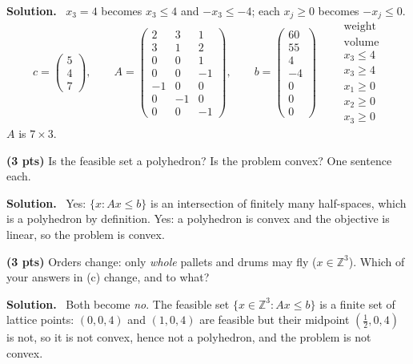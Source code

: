 \documentclass[10pt]{article}
\newenvironment{solution}
  {\par\smallskip\begingroup\color{solink}\textbf{Solution.}\ }
  {\endgroup\par}
\begin{document}
\begin{parts}
\begin{solution}
$x_3 = 4$ becomes $x_3 \le 4$ and $-x_3 \le -4$; each $x_j \ge 0$ becomes $-x_j \le 0$.
\[
c = \begin{pmatrix} 5 \\ 4 \\ 7 \end{pmatrix}, \qquad
A = \begin{pmatrix}
  2 & 3 & 1 \\
  3 & 1 & 2 \\
  0 & 0 & 1 \\
  0 & 0 & -1 \\
  -1 & 0 & 0 \\
  0 & -1 & 0 \\
  0 & 0 & -1
\end{pmatrix}, \qquad
b = \begin{pmatrix} 60 \\ 55 \\ 4 \\ -4 \\ 0 \\ 0 \\ 0 \end{pmatrix}
\qquad
\begin{array}{l}
  \scriptstyle\text{weight} \\ \scriptstyle\text{volume} \\
  \scriptstyle x_3 \le 4 \\ \scriptstyle x_3 \ge 4 \\
  \scriptstyle x_1 \ge 0 \\ \scriptstyle x_2 \ge 0 \\ \scriptstyle x_3 \ge 0
\end{array}
\]
$A$ is $7 \times 3$.
\end{solution}

\item \textbf{(3 pts)} Is the feasible set a polyhedron? Is the problem convex?
  One sentence each.

\begin{solution}
Yes: $\{x : Ax \le b\}$ is an intersection of finitely many half-spaces, which is
a polyhedron by definition. Yes: a polyhedron is convex and the objective is linear,
so the problem is convex.
\end{solution}

\item \textbf{(3 pts)} Orders change: only \emph{whole} pallets and drums may fly
  ($x \in \mathbb{Z}^3$). Which of your answers in (c) change, and to what?

\begin{solution}
Both become \emph{no}. The feasible set $\{x \in \mathbb{Z}^3 : Ax \le b\}$ is a
finite set of lattice points: $(0,0,4)$ and $(1,0,4)$ are feasible but their midpoint
$(\tfrac12,0,4)$ is not, so it is not convex, hence not a polyhedron, and the problem
is not convex.
\end{solution}
\end{parts}
\end{document}
